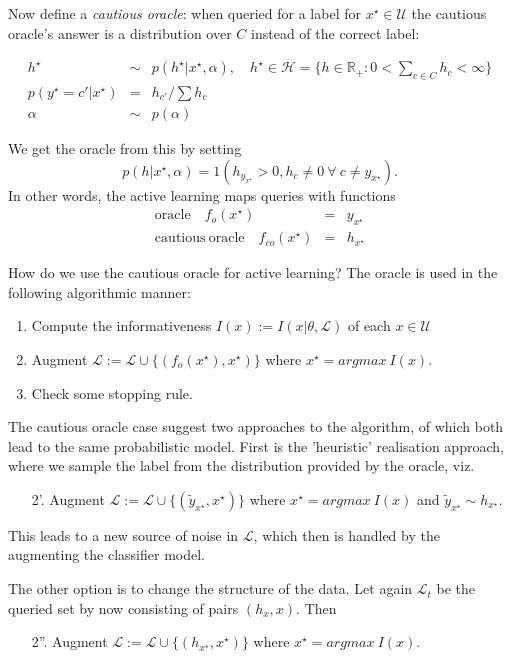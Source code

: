 \documentclass[10pt, onecolumn]{article}
\newcommand{\U}{\mathcal{U}}
\renewcommand{\L}{\mathcal{L}}
\newcommand{\newx}{{x^\star}}
\newcommand{\newy}{y^\star}
\newcommand{\answer}{h^\star}
\renewcommand{\H}{\mathcal{H}}
\newcommand{\R}{\mathbb{R}}
\begin{document}
Now define a \emph{cautious oracle}: when queried for a label for $\newx\in \U$ the cautious oracle's answer is a distribution over $C$ instead of the correct label:

\begin{eqnarray}
\answer & \sim & p(\answer | \newx, \alpha), \quad \answer \in \H=\{h\in \R_+: 0<\sum_{c\in C} h_c<\infty\}\\
p(\newy=c' | \newx) &=&h_{c'}/\sum h_{c} \\
\alpha & \sim & p(\alpha)
\end{eqnarray}

We get the oracle from this by setting $$p(h|\newx,\alpha)=1(h_{y_\newx}>0, h_{c}\neq 0\  \forall\ c\neq y_\newx).$$ In other words, the active learning maps queries with functions
\begin{eqnarray}
\mathrm{oracle} \quad f_o(\newx) & = & y_\newx \\
\mathrm{cautious\ oracle} \quad f_{co}(\newx) & = & h_\newx
\end{eqnarray}

How do we use the cautious oracle for active learning? The oracle is used in the following algorithmic manner:
\begin{enumerate}
\item Compute the informativeness $I(x):=I(x | \theta, \L)$ of each $x\in \U$
\item Augment $\L:= \L \cup \{(f_o(\newx), \newx)\}$ where $\newx = argmax\ I(x)$.
\item Check some stopping rule.
\end{enumerate}

The cautious oracle case suggest two approaches to the algorithm, of which both lead to the same probabilistic model. First is the 'heuristic' realisation approach, where we sample the label from the distribution provided by the oracle, viz.
\begin{enumerate}
\item[2'.] Augment $\L:= \L \cup \{(\tilde{y}_\newx, \newx)\}$ where $\newx = argmax\ I(x)$ and $\tilde{y}_\newx\sim h_\newx$.
\end{enumerate}
This leads to a new source of noise in $\L$, which then is handled by the augmenting the classifier model. 

The other option is to change the structure of the data. Let again $\L_t$ be the queried set by now consisting of pairs $(h_x,x)$. Then 
\begin{itemize}
\item[2''.] Augment $\L:=\L\cup \{(h_\newx, \newx)\}$ where $\newx=argmax\ I(x)$.
\end{itemize} 
\end{document}
